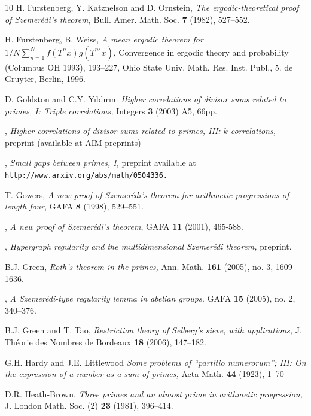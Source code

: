 \documentclass[12pt,a4paper,reqno]{amsart}
\numberwithin{equation}{section}
\theoremstyle{plain}
\theoremstyle{definition}
\def\emph#1{{\it #1}}
\def\textbf#1{{\bf #1}}
\begin{document}
\begin{thebibliography}{10}
H. Furstenberg, Y. Katznelson and D. Ornstein, \emph{The ergodic-theoretical proof of Szemer\'edi's theorem,} Bull. Amer. Math. Soc. \textbf{7} (1982), 527--552.

H. Furstenberg, B. Weiss, \emph{A mean ergodic theorem for $1/N \sum_{n=1}^N f(T^n x) g(T^{n^2} x)$}, Convergence in ergodic theory and probability (Columbus OH 1993), 193--227, Ohio State Univ. Math. Res. Inst. Publ., 5. de Gruyter, Berlin, 1996.

 D. Goldston and C.Y. Y{\i}ld{\i}r{\i}m \emph{Higher correlations of divisor sums related to primes, I: Triple correlations,} Integers \textbf{3} (2003) A5, 66pp.

 \bysame, \emph{Higher correlations of divisor sums related to primes, III: $k$-correlations,} preprint (available at AIM preprints)

 \bysame, \emph{Small gaps between primes, I,} preprint available at \\
\texttt{http://www.arxiv.org/abs/math/0504336.}

T. Gowers, \emph{A new proof of Szemer\'edi's theorem for arithmetic 
progressions of length four}, GAFA \textbf{8} (1998), 529--551.
 
\bysame, \emph{A new proof of Szemer\'edi's theorem}, GAFA \textbf{11} (2001), 465-588.

\bysame, \emph{Hypergraph regularity and the multidimensional Szemer\'edi theorem,} preprint.

B.J. Green, \emph{Roth's theorem in the primes,} Ann. Math. \textbf{161} (2005), no. 3, 1609--1636.

\bysame, \emph{A Szemer\'edi-type regularity lemma in abelian groups,} GAFA \textbf{15} (2005), no. 2, 340--376.

B.J. Green and T. Tao, \emph{Restriction theory of Selberg's sieve, with applications,} J. Th\'eorie des Nombres de Bordeaux \textbf{18} (2006), 147--182.

 G.H. Hardy and J.E. Littlewood \emph{Some problems of ``partitio numerorum''; III: On the expression of a number as a sum of primes,} Acta Math. \textbf{44} (1923), 1--70

D.R. Heath-Brown, \emph{Three primes and an almost prime in arithmetic progression,} J. London Math. Soc. (2) \textbf{23} (1981), 396--414.


\end{thebibliography}
\end{document}
